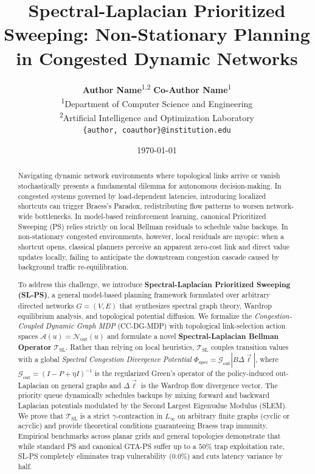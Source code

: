 \documentclass[11pt,a4paper]{article}
\title{\textbf{Spectral-Laplacian Prioritized Sweeping: Non-Stationary Planning in Congested Dynamic Networks}}
\author{
  \textbf{Author Name}\textsuperscript{1,2} \quad \textbf{Co-Author Name}\textsuperscript{1} \\
  \textsuperscript{1}Department of Computer Science and Engineering \\
  \textsuperscript{2}Artificial Intelligence and Optimization Laboratory \\
  \texttt{\{author, coauthor\}@institution.edu}
}
\date{\today}
\begin{document}
\maketitle

\begin{abstract}
Navigating dynamic network environments where topological links arrive or vanish stochastically presents a fundamental dilemma for autonomous decision-making. In congested systems governed by load-dependent latencies, introducing localized shortcuts can trigger Braess's Paradox, redistributing flow patterns to worsen network-wide bottlenecks. In model-based reinforcement learning, canonical Prioritized Sweeping (PS) relies strictly on local Bellman residuals to schedule value backups. In non-stationary congested environments, however, local residuals are myopic: when a shortcut opens, classical planners perceive an apparent zero-cost link and direct value updates locally, failing to anticipate the downstream congestion cascade caused by background traffic re-equilibration.

To address this challenge, we introduce \textbf{Spectral-Laplacian Prioritized Sweeping (SL-PS)}, a general model-based planning framework formulated over arbitrary directed networks $G = (V, E)$ that synthesizes spectral graph theory, Wardrop equilibrium analysis, and topological potential diffusion. We formalize the \textit{Congestion-Coupled Dynamic Graph MDP} (CC-DG-MDP) with topological link-selection action spaces $\mathcal{A}(u) = \mathcal{N}_{\text{out}}(u)$ and formulate a novel \textbf{Spectral-Laplacian Bellman Operator} $\mathcal{T}_{\text{SL}}$. Rather than relying on local heuristics, $\mathcal{T}_{\text{SL}}$ couples transition values with a global \textit{Spectral Congestion Divergence Potential} $\Phi_{\text{spec}} = \mathcal{G}_{\text{out}} |B \Delta \vec{\ell}|$, where $\mathcal{G}_{\text{out}} = (I - P + \eta I)^{-1}$ is the regularized Green's operator of the policy-induced out-Laplacian on general graphs and $\Delta \vec{\ell}$ is the Wardrop flow divergence vector. The priority queue dynamically schedules backups by mixing forward and backward Laplacian potentials modulated by the Second Largest Eigenvalue Modulus (SLEM). We prove that $\mathcal{T}_{\text{SL}}$ is a strict $\gamma$-contraction in $L_\infty$ on arbitrary finite graphs (cyclic or acyclic) and provide theoretical conditions guaranteeing Braess trap immunity. Empirical benchmarks across planar grids and general topologies demonstrate that while standard PS and canonical GTA-PS suffer up to a $50\%$ trap exploitation rate, SL-PS completely eliminates trap vulnerability ($0.0\%$) and cuts latency variance by half.
\end{abstract}
\end{document}
